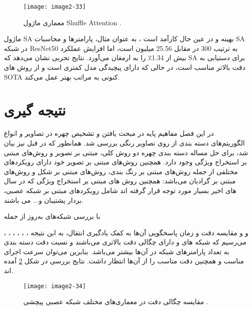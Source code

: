 \begin{figure}[h]
\centering
  \texttt{[image: image2-33]}
  \caption{
  معماری ماژول Shuffle Attention
   \cite{yang2021sanet}.}
  \label{image2-33}
\end{figure}

\noindent
ماژول SA بهینه و در عین حال کارآمد است ، به عنوان مثال، پارامترها و محاسبات SA در شبکه ResNet50 به ترتیب 300 در مقابل 25.56 میلیون است، اما افزایش عملکرد بیش از 1.34٪ را به ارمغان می‌آورد. نتایج تجربی نشان می‌دهد که SA برای دستیابی به دقت بالاتر مناسب است، در حالی که دارای پیچیدگی مدل کمتری است و از روش های SOTA  کنونی به مراتب بهتر عمل می‌کند. 

\section{نتیجه گیری}
در این فصل مفاهیم‌ پایه در مبحث یافتن و تشخیص چهره در تصاویر و انواع الگوریتم‌های دسته ‌بندی از روی تصاویر رنگی بررسی شد. همانطور که در قبل نیز بیان شد، برای حل مساله دسته ‌بندی چهره دو روش کلی، مبتنی بر تصویر و روش‌های مبتنی بر استخراج ویژگی وجود دارد. همچنین روش‌های مبتنی بر تصویر خود دارای رویکردهای مختلفی از جمله روش‌های مبتنی بر رنگ‌ بندی، روش‌های مبتنی بر شکل و روش‌های مبتنی بر گرادیان می‌باشد: همچنین روش های مبتنی بر استخراج ویژگی که در سال های اخیر بسیار مورد توجه قرار گرفته اند شامل رویکردهای مبتنی بر شبکه عصبی، بردار پشتیبان و... می باشند.

\noindent
با بررسی شبکه‌های به‌روز از جمله

 ،
 ،
 ،
 ،
 ،
 ،
و
و مقایسه دقت و زمان پاسخگویی آن‌ها به کمک یادگیری انتقال، به این نتیجه می‌رسیم که شبکه های  و  دارای چگالی دقت بالاتری می‌باشند و نسبت دقت دسته بندی به تعداد پارامترهای شبکه در آن‌ها بیشتر می‌باشد. بنابرین می‌توان سرعت اجرای مناسب و همچنین دقت مناسب را از آن‌ها انتظار داشت. نتایج بررسی در شکل \ref{image2-34} آمده اند.

\begin{figure}[h]
\centering
  \texttt{[image: image2-34]}
  \caption{
  مقایسه چگالی دقت در معماری‌های مختلف شبکه عصبی پیچشی 
   \cite{Bianco_2018}.}
  \label{image2-34}
\end{figure}
